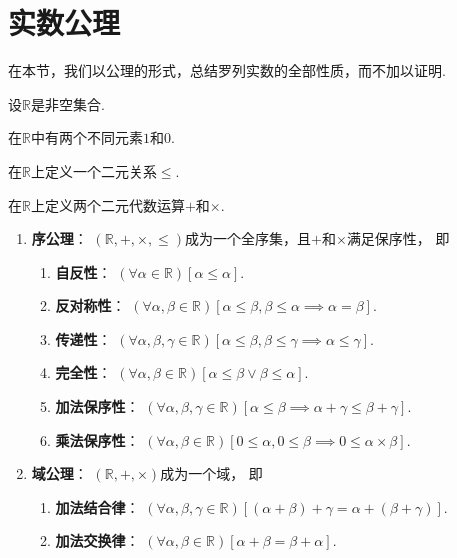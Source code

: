 \section{实数公理}
在本节，我们以公理的形式，总结罗列实数的全部性质，而不加以证明.
\begin{axiom}
设\(\mathbb{R}\)是非空集合.

在\(\mathbb{R}\)中有两个不同元素\(1\)和\(0\).

在\(\mathbb{R}\)上定义一个二元关系\(\leq\).

在\(\mathbb{R}\)上定义两个二元代数运算\(+\)和\(\times\).

\begin{enumerate}
	\item {\rm\bf 序公理}：
	\((\mathbb{R},+,\times,\leq)\)成为一个全序集，且\(+\)和\(\times\)满足保序性，
	即\begin{enumerate}
		\item {\rm\bf 自反性}：
		\((\forall\alpha\in\mathbb{R})
		[\alpha\leq\alpha]\).

		\item {\rm\bf 反对称性}：
		\((\forall\alpha,\beta\in\mathbb{R})
		[\alpha\leq\beta,\beta\leq\alpha\implies\alpha=\beta]\).

		\item {\rm\bf 传递性}：
		\((\forall\alpha,\beta,\gamma\in\mathbb{R})
		[\alpha\leq\beta,\beta\leq\gamma\implies\alpha\leq\gamma]\).

		\item {\rm\bf 完全性}：
		\((\forall\alpha,\beta\in\mathbb{R})
		[\alpha\leq\beta\lor\beta\leq\alpha]\).

		\item {\rm\bf 加法保序性}：
		\((\forall\alpha,\beta,\gamma\in\mathbb{R})
		[\alpha\leq\beta\implies\alpha+\gamma\leq\beta+\gamma]\).

		\item {\rm\bf 乘法保序性}：
		\((\forall\alpha,\beta\in\mathbb{R})
		[0\leq\alpha,0\leq\beta\implies0\leq\alpha\times\beta]\).
	\end{enumerate}

	\item {\rm\bf 域公理}：
	\((\mathbb{R},+,\times)\)成为一个域，
	即\begin{enumerate}
		\item {\rm\bf 加法结合律}：
		\((\forall\alpha,\beta,\gamma\in\mathbb{R})
		[(\alpha+\beta)+\gamma=\alpha+(\beta+\gamma)]\).

		\item {\rm\bf 加法交换律}：
		\((\forall\alpha,\beta\in\mathbb{R})
		[\alpha+\beta=\beta+\alpha]\).


\end{enumerate}
\end{enumerate}
\end{axiom}
